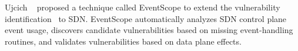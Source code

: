 Ujcich \etal~\cite{Ujcich+etal:2020:EventScope} proposed a technique called
EventScope to extend the vulnerability identification~\cite{6994333} to SDN.
EventScope automatically analyzes SDN control plane event usage, discovers
candidate vulnerabilities based on missing event-handling routines, and
validates vulnerabilities based on data plane effects.

